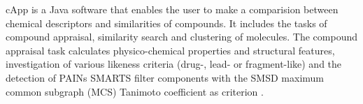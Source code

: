 cApp is a Java software that enables the user to make a comparision between chemical descriptors and similarities of compounds. It includes the tasks of compound appraisal, similarity search and clustering of molecules. The compound appraisal task calculates physico-chemical properties and structural features, investigation of various likeness criteria (drug-, lead- or fragment-like) and the detection of PAINs SMARTS filter components with the SMSD maximum common subgraph (MCS) Tanimoto coefficient as criterion \cite{Amani_2015}. 